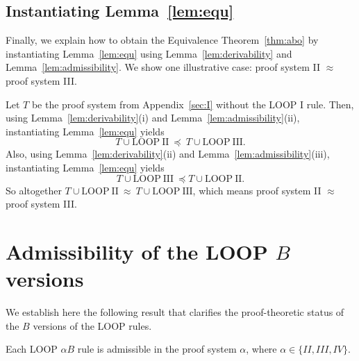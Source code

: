 \documentclass[runningheads]{llncs}       %
\begin{document}
\subsection{Instantiating Lemma~\ref{lem:equ}}
\label{subsec:instantiate}

Finally, we explain how to obtain the Equivalence Theorem~\ref{thm:abo} by instantiating Lemma~\ref{lem:equ}
using Lemma~\ref{lem:derivability} and Lemma~\ref{lem:admissibility}.
We show one illustrative case: proof system II $\approx$ proof system III.

Let $T$ be the proof system from Appendix~\ref{sec:I} without the LOOP I rule.
Then, using Lemma~\ref{lem:derivability}(i) and Lemma~\ref{lem:admissibility}(ii), 
instantiating Lemma~\ref{lem:equ} yields
\[
 T \cup \mathrm{LOOP\ II}\ \preceq\ T \cup \mathrm{LOOP\ III}.
\]
Also, using Lemma~\ref{lem:derivability}(ii) and Lemma~\ref{lem:admissibility}(iii), 
instantiating Lemma~\ref{lem:equ} yields
\[
 T \cup \mathrm{LOOP\ III}\ \preceq T \cup \mathrm{LOOP\ II}.
\]
So altogether $T \cup \mathrm{LOOP\ II}\ \approx\ T \cup \mathrm{LOOP\ III}$,
which means proof system II $\approx$ proof system III.


\section{Admissibility of the LOOP $B$ versions}
\label{sec:B}

We establish here the following result that clarifies the
proof-theoretic status of the $B$ versions of the LOOP rules.

\begin{theorem}
  Each LOOP $\alpha B$ rule is admissible in the proof system
  $\alpha$, where $\alpha \in \{II, III, IV\}$.
\end{theorem}
\end{document}
